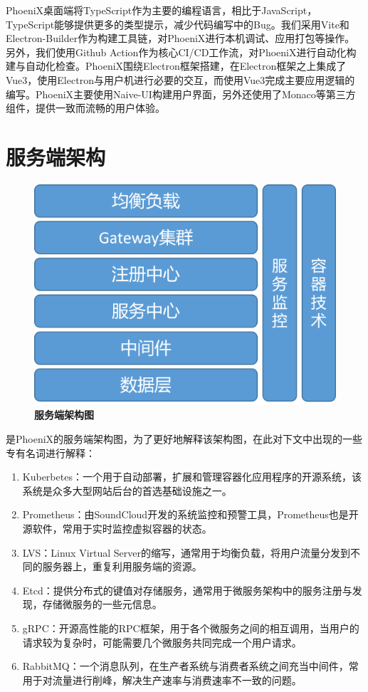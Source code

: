PhoeniX桌面端将TypeScript作为主要的编程语言，相比于JavaScript，TypeScript能够提供更多的类型提示，减少代码编写中的Bug。我们采用Vite和Electron-Builder作为构建工具链，对PhoeniX进行本机调试、应用打包等操作。另外，我们使用Github Action作为核心CI/CD工作流，对PhoeniX进行自动化构建与自动化检查。PhoeniX围绕Electron框架搭建，在Electron框架之上集成了Vue3，使用Electron与用户机进行必要的交互，而使用Vue3完成主要应用逻辑的编写。PhoeniX主要使用Naive-UI构建用户界面，另外还使用了Monaco等第三方组件，提供一致而流畅的用户体验。

\section{服务端架构}

\begin{figure}[H]
  \centering
  \includegraphics[scale=0.75]{figure/back_arch.png}
  \caption{\textbf{服务端架构图}}
  \label{fig:back_arch}
\end{figure}

是PhoeniX的服务端架构图，为了更好地解释该架构图，在此对下文中出现的一些专有名词进行解释：

\begin{enumerate}
  \item Kuberbetes：一个用于自动部署，扩展和管理容器化应用程序的开源系统，该系统是众多大型网站后台的首选基础设施之一。
  \item Prometheus：由SoundCloud开发的系统监控和预警工具，Prometheus也是开源软件，常用于实时监控虚拟容器的状态。
  \item LVS：Linux Virtual Server的缩写，通常用于均衡负载，将用户流量分发到不同的服务器上，重复利用服务端的资源。
  \item Etcd：提供分布式的键值对存储服务，通常用于微服务架构中的服务注册与发现，存储微服务的一些元信息。
  \item gRPC：开源高性能的RPC框架，用于各个微服务之间的相互调用，当用户的请求较为复杂时，可能需要几个微服务共同完成一个用户请求。
  \item RabbitMQ：一个消息队列，在生产者系统与消费者系统之间充当中间件，常用于对流量进行削峰，解决生产速率与消费速率不一致的问题。
\end{enumerate}

